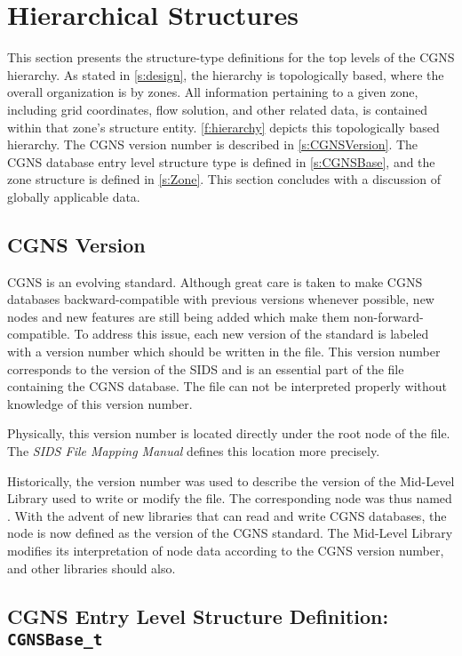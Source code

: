 \section{Hierarchical Structures}
\label{s:topo}
\thispagestyle{plain}

This section presents the structure-type definitions for the top levels
of the CGNS hierarchy.
As stated in \autoref{s:design}, the hierarchy is topologically
based, where the overall organization is by zones.
All information pertaining to a given zone, including grid coordinates,
flow solution, and other related data, is contained within that zone's
structure entity.
\autoref{f:hierarchy} depicts this topologically based hierarchy.
The CGNS version number is described in \autoref{s:CGNSVersion}.
The CGNS database entry level structure type is defined in
\autoref{s:CGNSBase}, and the zone structure is defined in
\autoref{s:Zone}.
This section concludes with a discussion of globally applicable data.

\subsection{CGNS Version}
\label{s:CGNSVersion}

CGNS is an evolving standard.
Although great care is taken to make CGNS databases backward-compatible
with previous versions whenever possible, new nodes and new features are
still being added which make them non-forward-compatible.
To address this issue, each new version of the standard is labeled with
a version number which should be written in the file.
This version number corresponds to the version of the SIDS and is an
essential part of the file containing the CGNS database.
The file can not be interpreted properly without knowledge of this
version number.

Physically, this version number is located directly under the root node
of the file.
The \textit{SIDS File Mapping Manual}
defines this location more precisely.

Historically, the version number was used to describe the version of the
Mid-Level Library used to write or modify the file.
The corresponding node was thus named .
With the advent of new libraries that can read and write CGNS databases,
the node is now defined as the version of the CGNS standard.
The Mid-Level Library modifies its interpretation of node data according
to the CGNS version number, and other libraries should also.

\subsection{CGNS Entry Level Structure Definition: \texttt{CGNSBase\_t}}
\label{s:CGNSBase}

